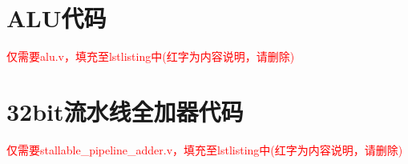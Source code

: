 \appendix
\section{ALU代码}
\textcolor{red}{仅需要alu.v，填充至lstlisting中(红字为内容说明，请删除)}


\section{32bit流水线全加器代码}
\textcolor{red}{仅需要stallable\_pipeline\_adder.v，填充至lstlisting中(红字为内容说明，请删除)}


